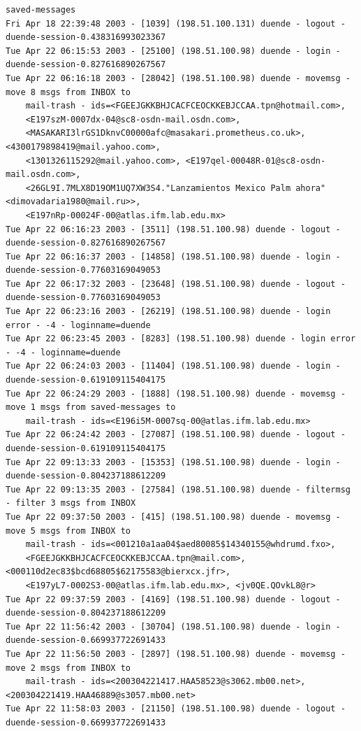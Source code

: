 \begin{lstlisting}[style=terminal]
    saved-messages
Fri Apr 18 22:39:48 2003 - [1039] (198.51.100.131) duende - logout - duende-session-0.438316993023367
Tue Apr 22 06:15:53 2003 - [25100] (198.51.100.98) duende - login - duende-session-0.827616890267567
Tue Apr 22 06:16:18 2003 - [28042] (198.51.100.98) duende - movemsg - move 8 msgs from INBOX to 
    mail-trash - ids=<FGEEJGKKBHJCACFCEOCKKEBJCCAA.tpn@hotmail.com>, 
    <E197szM-0007dx-04@sc8-osdn-mail.osdn.com>, 
    <MASAKARI3lrGS1DknvC00000afc@masakari.prometheus.co.uk>, <4300179898419@mail.yahoo.com>, 
    <1301326115292@mail.yahoo.com>, <E197qel-00048R-01@sc8-osdn-mail.osdn.com>, 
    <26GL9I.7MLX8D19OM1UQ7XW3S4."Lanzamientos Mexico Palm ahora"<dimovadaria1980@mail.ru>>, 
    <E197nRp-00024F-00@atlas.ifm.lab.edu.mx>
Tue Apr 22 06:16:23 2003 - [3511] (198.51.100.98) duende - logout - duende-session-0.827616890267567
Tue Apr 22 06:16:37 2003 - [14858] (198.51.100.98) duende - login - duende-session-0.77603169049053
Tue Apr 22 06:17:32 2003 - [23648] (198.51.100.98) duende - logout - duende-session-0.77603169049053
Tue Apr 22 06:23:16 2003 - [26219] (198.51.100.98) duende - login error - -4 - loginname=duende
Tue Apr 22 06:23:45 2003 - [8283] (198.51.100.98) duende - login error - -4 - loginname=duende
Tue Apr 22 06:24:03 2003 - [11404] (198.51.100.98) duende - login - duende-session-0.619109115404175
Tue Apr 22 06:24:29 2003 - [1888] (198.51.100.98) duende - movemsg - move 1 msgs from saved-messages to 
    mail-trash - ids=<E196i5M-0007sq-00@atlas.ifm.lab.edu.mx>
Tue Apr 22 06:24:42 2003 - [27087] (198.51.100.98) duende - logout - duende-session-0.619109115404175
Tue Apr 22 09:13:33 2003 - [15353] (198.51.100.98) duende - login - duende-session-0.804237188612209
Tue Apr 22 09:13:35 2003 - [27584] (198.51.100.98) duende - filtermsg - filter 3 msgs from INBOX
Tue Apr 22 09:37:50 2003 - [415] (198.51.100.98) duende - movemsg - move 5 msgs from INBOX to 
    mail-trash - ids=<001210a1aa04$aed80085$14340155@whdrumd.fxo>, 
    <FGEEJGKKBHJCACFCEOCKKEBJCCAA.tpn@mail.com>, <000110d2ec83$bcd68805$62175583@bierxcx.jfr>, 
    <E197yL7-0002S3-00@atlas.ifm.lab.edu.mx>, <jv0QE.QOvkL8@r>
Tue Apr 22 09:37:59 2003 - [4169] (198.51.100.98) duende - logout - duende-session-0.804237188612209
Tue Apr 22 11:56:42 2003 - [30704] (198.51.100.98) duende - login - duende-session-0.669937722691433
Tue Apr 22 11:56:50 2003 - [2897] (198.51.100.98) duende - movemsg - move 2 msgs from INBOX to 
    mail-trash - ids=<200304221417.HAA58523@s3062.mb00.net>, <200304221419.HAA46889@s3057.mb00.net>
Tue Apr 22 11:58:03 2003 - [21150] (198.51.100.98) duende - logout - duende-session-0.669937722691433

\end{lstlisting}
